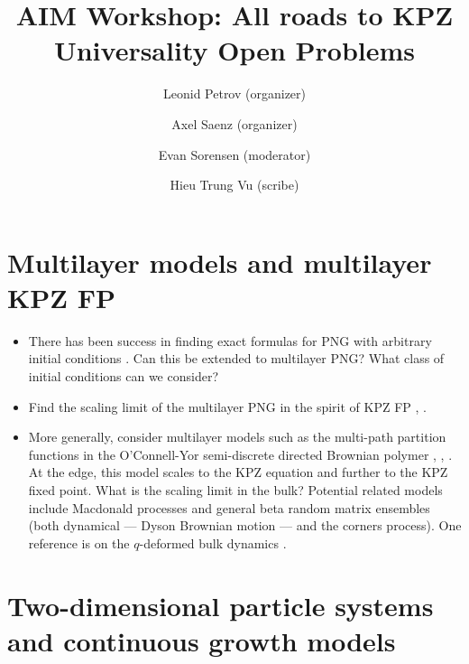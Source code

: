 \documentclass{article}
\title{AIM Workshop: All roads to KPZ Universality Open Problems}
\author{Leonid Petrov (organizer) \and Axel Saenz (organizer) \and
Evan Sorensen (moderator) \and  Hieu Trung Vu (scribe)}
\theoremstyle{definition}
\begin{document}
\maketitle



\section{Multilayer models and multilayer KPZ FP}
\begin{itemize}
	\item There has been success in finding exact formulas for PNG with arbitrary initial conditions
		\cite{matetski2022polynuclear}.
		Can this be extended to multilayer PNG?
		What class of initial conditions can we consider?
	\item Find the scaling limit of the multilayer PNG in the spirit of KPZ FP
		\cite{matetski2017kpz}, \cite{matetski2022polynuclear}.
	\item More generally, consider multilayer models such as the multi-path partition functions in the
		O'Connell-Yor semi-discrete directed Brownian polymer
		\cite[Theorem~3.1 and subsequent SDEs]{Oconnell2009_Toda}, \cite[Definition~4.1.26]{BorodinCorwin2011Macdonald},
		\cite[Section~8.4]{BorodinPetrov2013NN}.
		At the edge, this model scales to the KPZ equation
		and further to the KPZ fixed point. What is the scaling limit in the bulk?
		Potential related models include Macdonald processes and general beta random matrix ensembles (both dynamical --- Dyson
		Brownian motion --- and the corners process).
		One reference is on the $q$-deformed bulk dynamics \cite{corwin2015stationary}.
\end{itemize}

\section{Two-dimensional particle systems and continuous growth models}
\end{document}
